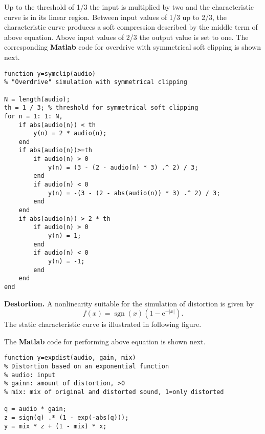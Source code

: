 \documentclass[10pt,a4paper,oneside]{article}
\begin{document}

Up to the threshold of 1/3 the input is multiplied by two and the characteristic curve is in its linear region. Between input values of 1/3 up to 2/3, the characteristic curve produces a soft compression described by the middle term of above equation. Above input values of 2/3 the output value is set to one. The corresponding {\bfseries Matlab} code for overdrive with symmetrical soft clipping is shown next.
\begin{lstlisting}
function y=symclip(audio)
% "Overdrive" simulation with symmetrical clipping

N = length(audio);
th = 1 / 3; % threshold for symmetrical soft clipping 
for n = 1: 1: N,
	if abs(audio(n)) < th
		y(n) = 2 * audio(n);
	end
	if abs(audio(n))>=th
		if audio(n) > 0
			y(n) = (3 - (2 - audio(n) * 3) .^ 2) / 3; 
		end
		if audio(n) < 0
			y(n) = -(3 - (2 - abs(audio(n)) * 3) .^	2) / 3; 
		end
	end 
	if abs(audio(n)) > 2 * th
		if audio(n) > 0
			y(n) = 1;
		end
		if audio(n) < 0
			y(n) = -1;
		end
	end
end
\end{lstlisting}
{\bfseries Destortion.} A nonlinearity suitable for the simulation of distortion is given by
\[
f(x)=\operatorname{sgn}(x)\left(1-\mathrm{e}^{-|x|}\right).
\]
The static characteristic curve is illustrated in following figure.


The {\bfseries Matlab} code for performing above equation is shown next.
\begin{lstlisting}
function y=expdist(audio, gain, mix)
% Distortion based on an exponential function
% audio: input
% gainn: amount of distortion, >0
% mix: mix of original and distorted sound, 1=only distorted

q = audio * gain;
z = sign(q) .* (1 - exp(-abs(q)));
y = mix * z + (1 - mix) * x;

\end{lstlisting}
\end{document}

